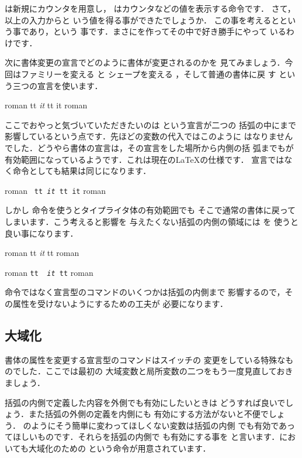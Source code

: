 は新規にカウンタを用意し，
はカウンタなどの値を表示する命令です．
さて，以上の入力からと
いう値を得る事ができたでしょうか．
この事を考えるとという事であり，という
事です．まさにを作ってその中で好き勝手にやって
いるわけです．

次に書体変更の宣言でどのように書体が変更されるのかを
見てみましょう．今回はファミリーを変える と
シェープを変える ，そして普通の書体に戻
す という三つの宣言を使います．
\begin{InOut}
roman {\ttfamily tt {\itshape it}
 tt \normalfont it} roman
\end{InOut}
ここでおやっと気づいていただきたいのは という宣言が二つの
括弧の中にまで影響しているという点です．先ほどの変数の代入ではこのように
はなりませんでした．どうやら書体の宣言は，その宣言をした場所から内側の括
弧までもが有効範囲になっているようです．これは現在の{\LaTeX}の仕様です．
宣言ではなく命令としても結果は同じになります．

\begin{InOut}
roman \texttt{ tt \textit{it}
 tt \normalfont it} roman
\end{InOut}
しかし 命令を使うとタイプライタ体の有効範囲でも
そこで通常の書体に戻ってしまいます．こう考えると影響を
与えたくない括弧の内側の領域には を
使うと良い事になります．
\begin{InOut}
roman {\ttfamily tt {\normalfont
  \itshape it} tt} roman\par
roman \texttt{tt {\normalfont
  \textit{it}} tt} roman
\end{InOut}

命令ではなく宣言型のコマンドのいくつかは括弧の内側まで
影響するので，その属性を受けないようにするための工夫が
必要になります．

\subsection{大域化}
書体の属性を変更する宣言型のコマンドはスイッチの
変更をしている特殊なものでした．ここでは最初の
大域変数と局所変数の二つをもう一度見直しておきましょう．

括弧の内側で定義した内容を外側でも有効にしたいときは
どうすれば良いでしょう．また括弧の外側の定義を内側にも
有効にする方法がないと不便でしょう．
のようにそう簡単に変わってほしくない変数は括弧の内側
でも有効であってほしいものです．それらを括弧の内側で
も有効にする事を{}
と言います．{\laTEX}においても大域化のための 
という命令が用意されています．

